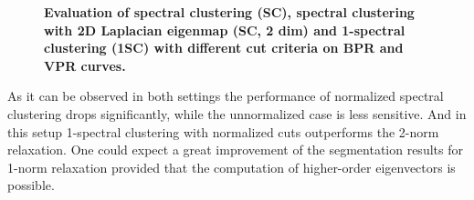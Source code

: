 \begin{figure}[htbp]
{}
\quad%
\caption[Evaluation of spectral clustering (SC), spectral clustering with 2D Laplacian eigenmap (SC, 2 dim) and 1-spectral clustering (1SC) with different cut criteria 
on boundary precision-recall (BPR) and volume precision-recall (VPR) curves]{
{\bf Evaluation of spectral clustering (SC), spectral clustering with 2D Laplacian eigenmap (SC, 2 dim) and 1-spectral clustering (1SC) with different cut criteria 
on BPR and VPR curves.}}
\label{fig:2dim}
\end{figure}

As it can be observed in both settings the performance of normalized spectral clustering drops significantly, while the unnormalized case is less sensitive. 
And in this setup 1-spectral clustering with normalized cuts outperforms the 2-norm relaxation. One could expect a great improvement of the segmentation results for 1-norm relaxation provided that the computation of higher-order
eigenvectors is possible.
